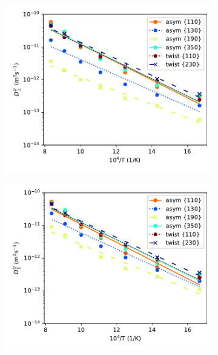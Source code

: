 \documentclass{elsarticle}
\providecommand{\DIFdel}[1]{}
\providecommand{\DIFaddbegin}{} %
\providecommand{\DIFdelbegin}{} %
\providecommand{\DIFdelend}{} %
\begin{document}
\DIFdelbegin \DIFdel{The orientation-averaged values for }\DIFdelend \DIFaddbegin \begin{figure}[!ht]
\begin{subfigure}{0.49\textwidth}
	\centering
	\caption{}
	\includegraphics[width=\textwidth]{asym_twist_U_Dx.pdf}
\end{subfigure}
\begin{subfigure}{0.49\textwidth}
	\centering
	\caption{}
	\includegraphics[width=\textwidth]{asym_twist_U_Dz.pdf}
\end{subfigure}


\end{figure}
\end{document}
